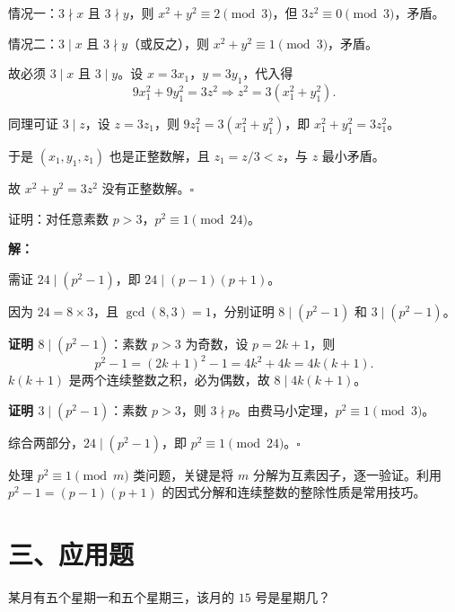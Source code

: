 \documentclass[12pt, a4paper]{ctexart}
\begin{document}
情况一：$3 \nmid x$ 且 $3 \nmid y$，则 $x^2 + y^2 \equiv 2 \pmod{3}$，但 $3z^2 \equiv 0 \pmod{3}$，矛盾。

情况二：$3 \mid x$ 且 $3 \nmid y$（或反之），则 $x^2 + y^2 \equiv 1 \pmod{3}$，矛盾。

故必须 $3 \mid x$ 且 $3 \mid y$。设 $x = 3x_1$，$y = 3y_1$，代入得
\[ 9x_1^2 + 9y_1^2 = 3z^2 \Rightarrow z^2 = 3(x_1^2 + y_1^2). \]

同理可证 $3 \mid z$，设 $z = 3z_1$，则 $9z_1^2 = 3(x_1^2 + y_1^2)$，即 $x_1^2 + y_1^2 = 3z_1^2$。

于是 $(x_1, y_1, z_1)$ 也是正整数解，且 $z_1 = z/3 < z$，与 $z$ 最小矛盾。

故 $x^2 + y^2 = 3z^2$ 没有正整数解。\hfill $\square$

\begin{examplebox}[【例题14】数论综合证明]
证明：对任意素数 $p > 3$，$p^2 \equiv 1 \pmod{24}$。
\end{examplebox}

\textbf{解：}

需证 $24 \mid (p^2 - 1)$，即 $24 \mid (p-1)(p+1)$。

因为 $24 = 8 \times 3$，且 $\gcd(8, 3) = 1$，分别证明 $8 \mid (p^2-1)$ 和 $3 \mid (p^2-1)$。

\textbf{证明 $8 \mid (p^2-1)$}：素数 $p > 3$ 为奇数，设 $p = 2k+1$，则
\[ p^2 - 1 = (2k+1)^2 - 1 = 4k^2 + 4k = 4k(k+1). \]
$k(k+1)$ 是两个连续整数之积，必为偶数，故 $8 \mid 4k(k+1)$。

\textbf{证明 $3 \mid (p^2-1)$}：素数 $p > 3$，则 $3 \nmid p$。由费马小定理，$p^2 \equiv 1 \pmod{3}$。

综合两部分，$24 \mid (p^2 - 1)$，即 $p^2 \equiv 1 \pmod{24}$。\hfill $\square$

\begin{tipbox}[方法总结]
处理 $p^2 \equiv 1 \pmod{m}$ 类问题，关键是将 $m$ 分解为互素因子，逐一验证。利用 $p^2 - 1 = (p-1)(p+1)$ 的因式分解和连续整数的整除性质是常用技巧。
\end{tipbox}

\section*{\textcolor{apppurple}{三、应用题}}

\begin{appbox}[【应用1】日历问题]
某月有五个星期一和五个星期三，该月的 $15$ 号是星期几？
\end{appbox}
\end{document}
